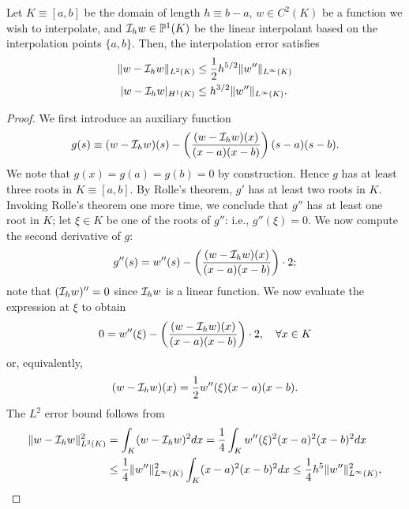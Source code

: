 \begin{lemma}
  Let $K \equiv [a,b]$ be the domain of length $h \equiv b - a$, $w \in C^2(K)$ be a function we wish to interpolate, and $\mathcal{I}_h w \in \mathbb{P}^1(K)$ be the linear interpolant based on the interpolation points $\{a,b\}$. Then, the interpolation error satisfies
  \begin{align}
    \| w - \mathcal{I}_h w \|_{L^2(K)} &\leq \frac{1}{2} h^{5/2} \| w'' \|_{L^\infty(K)} \label{eq:fe_interp_lin_l2_elem} \\
    | w - \mathcal{I}_h w |_{H^1(K)} &\leq h^{3/2} \| w '' \|_{L^\infty(K)}. \label{eq:fe_interp_lin_h1_elem}
  \end{align}
  \begin{proof}
    We first introduce an auxiliary function
    \begin{equation*}
      g(s) \equiv (w - \mathcal{I}_hw)(s) - \left(
      \frac{(w - \mathcal{I}_h w)(x)}{(x - a)(x-b)}
      \right)(s - a)(s-b).
    \end{equation*}
  We note that $g(x) = g(a) = g(b) = 0$ by construction. Hence $g$ has at least three roots in $K \equiv[a,b]$.  By Rolle's theorem, $g'$ has at least two roots in $K$.  Invoking Rolle's theorem one more time, we conclude that $g''$ has at least one root in $K$; let $\xi \in K$ be one of the roots of $g''$: i.e., $g''(\xi) = 0$.  We now compute the second derivative of $g$:
  \begin{equation*}
    g''(s) = w''(s) - \left(
      \frac{(w - \mathcal{I}_h w)(x)}{(x - a)(x-b)}
      \right) \cdot 2;
  \end{equation*}
  note that $(\mathcal{I}_h w)'' = 0$ since $\mathcal{I}_h w$ is a linear function.  We now evaluate the expression at $\xi$ to obtain
  \begin{equation*}
    0 = w''(\xi) - \left(
      \frac{(w - \mathcal{I}_h w)(x)}{(x - a)(x-b)}
      \right) \cdot 2, \quad \forall x \in K
  \end{equation*}
  or, equivalently,
  \begin{equation*}
    (w - \mathcal{I}_h w)(x) = \frac{1}{2} w''(\xi) (x - a)(x - b).
  \end{equation*}
  The $L^2$ error bound follows from
  \begin{align*}
    \| w - \calI_h w \|^2_{L^2(K)}
    &= \int_K (w - \calI_h w)^2 dx
    = \frac{1}{4} \int_K w''(\xi)^2 (x-a)^2 (x-b)^2 dx
    \\
    &\leq\frac{1}{4} \| w'' \|_{L^\infty(K)}^2 \int_K (x-a)^2(x-b)^2 dx
    \leq \frac{1}{4} h^5 \| w'' \|_{L^\infty(K)}^2,

\end{align*}
\end{proof}
\end{lemma}
